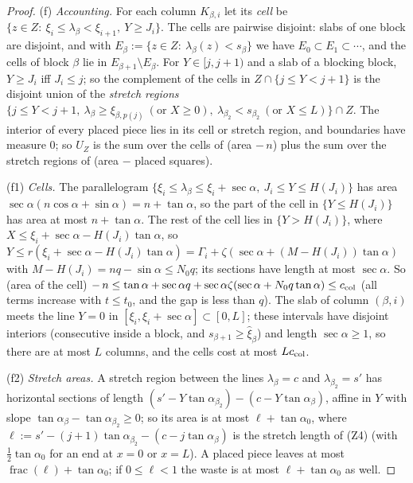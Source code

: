 \documentclass[11pt]{amsart}
\newcommand{\ca}{\cos\alpha}
\newcommand{\sa}{\sin\alpha}
\newcommand{\ta}{\tan\alpha}
\newcommand{\se}{\sec\alpha}
\newcommand{\taz}{\tan\alpha_0}
\theoremstyle{definition}
\theoremstyle{remark}
\numberwithin{equation}{section}
\begin{document}
\begin{proof}
(f) \emph{Accounting.} For each column $K_{\beta,i}$ let its \emph{cell} be
$\{z\in Z:\ \xi_i\le\lambda_\beta<\xi_{i+1},\ Y\ge J_i\}$. The cells are pairwise disjoint: slabs of one block are
disjoint, and with $E_\beta:=\{z\in Z:\ \lambda_\beta(z)<s_\beta\}$ we have $E_0\subset E_1\subset\cdots$, and the cells
of block $\beta$ lie in $E_{\beta+1}\setminus E_\beta$. For $Y\in[j,j+1)$ and a slab of a blocking block, $Y\ge J_i$ iff
$J_i\le j$; so the complement of the cells in $Z\cap\{j\le Y<j+1\}$ is the disjoint union of the \emph{stretch regions}
$\{j\le Y<j+1,\ \lambda_\beta\ge\xi_{\beta,p(j)}\ (\text{or }X\ge0),\ \lambda_{\beta_2}<s_{\beta_2}\ (\text{or }X\le L)\}\cap Z$.
The interior of every placed piece lies in its cell or stretch region, and boundaries have measure $0$; so
$U_Z$ is the sum over the cells of (area $-\,n$) plus the sum over the stretch regions of (area $-$ placed squares).

(f1) \emph{Cells.} The parallelogram $\{\xi_i\le\lambda_\beta\le\xi_i+\se,\ J_i\le Y\le H(J_i)\}$ has area
$\se(n\ca+\sa)=n+\ta$, so the part of the cell in $\{Y\le H(J_i)\}$ has area at most $n+\ta$. The rest of the cell lies in
$\{Y>H(J_i)\}$, where $X\le\xi_i+\se-H(J_i)\ta$, so $Y\le r(\xi_i+\se-H(J_i)\ta)=\Gamma_i+\zeta(\se+(M-H(J_i))\ta)$ with
$M-H(J_i)=nq-\sa\le N_0q$; its sections have length at most $\se$. So (area of the cell) $-\,n\le
\ta+\se q+\se\zeta(\se+N_0q\ta)\le c_{\rm col}$ (all terms increase with $t\le t_0$, and the gap is less than $q$). The
slab of column $(\beta,i)$ meets the line $Y=0$ in $[\xi_i,\xi_i+\se]\subset[0,L]$; these intervals have disjoint
interiors (consecutive inside a block, and $s_{\beta+1}\ge\hat\xi_\beta$) and length $\se\ge1$, so there are at most $L$
columns, and the cells cost at most $Lc_{\rm col}$.

(f2) \emph{Stretch areas.} A stretch region between the lines $\lambda_\beta=c$ and $\lambda_{\beta_2}=s'$ has horizontal
sections of length $(s'-Y\tan\alpha_{\beta_2})-(c-Y\tan\alpha_\beta)$, affine in $Y$ with slope
$\tan\alpha_\beta-\tan\alpha_{\beta_2}\ge0$; so its area is at most $\ell+\taz$, where
$\ell:=s'-(j+1)\tan\alpha_{\beta_2}-(c-j\tan\alpha_\beta)$ is the stretch length of (Z4) (with $\frac12\taz$ for an end at
$x=0$ or $x=L$). A placed piece leaves at most $\operatorname{frac}(\ell)+\taz$; if $0\le\ell<1$ the waste is at most
$\ell+\taz$ as well.


\end{proof}
\end{document}
